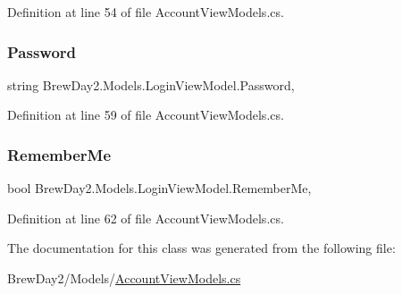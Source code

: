 Definition at line 54 of file Account\+View\+Models.\+cs.

\mbox{\label{class_brew_day2_1_1_models_1_1_login_view_model_aafcc3b27203de42fa31d7eff0880e24f}} 
\subsubsection{\texorpdfstring{Password}{Password}}
{\footnotesize\ttfamily string Brew\+Day2.\+Models.\+Login\+View\+Model.\+Password\hspace{0.3cm}{\ttfamily [get]}, {\ttfamily [set]}}



Definition at line 59 of file Account\+View\+Models.\+cs.

\mbox{\label{class_brew_day2_1_1_models_1_1_login_view_model_a3decffd7d74955bc298602d484d93e5a}} 
\subsubsection{\texorpdfstring{Remember\+Me}{RememberMe}}
{\footnotesize\ttfamily bool Brew\+Day2.\+Models.\+Login\+View\+Model.\+Remember\+Me\hspace{0.3cm}{\ttfamily [get]}, {\ttfamily [set]}}



Definition at line 62 of file Account\+View\+Models.\+cs.



The documentation for this class was generated from the following file\+:\begin{DoxyCompactItemize}
\item 
Brew\+Day2/\+Models/\mbox{\hyperlink{_account_view_models_8cs}{Account\+View\+Models.\+cs}}\end{DoxyCompactItemize}
